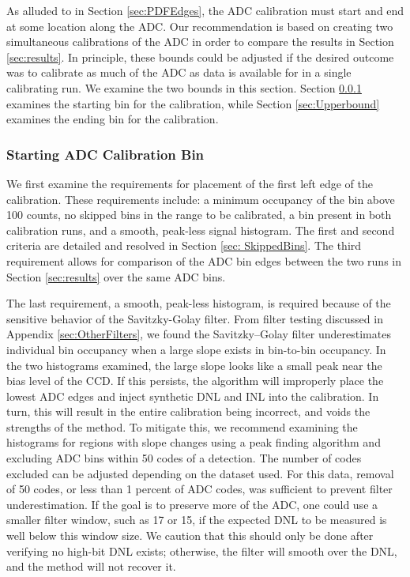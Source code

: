 \documentclass[linenumbers]{aastex7}
\begin{document}
As alluded to in Section \ref{sec:PDFEdges}, the ADC calibration must start and end at some location along the ADC. 
Our recommendation is based on creating two simultaneous calibrations of the ADC in order to compare the results in Section \ref{sec:results}. 
In principle, these bounds could be adjusted if the desired outcome was to calibrate as much of the ADC as data is available for in a single calibrating run. 
We examine the two bounds in this section. 
Section \ref{sec:Lowerbound} examines the starting bin for the calibration, while Section \ref{sec:Upperbound} examines the ending bin for the calibration.

\subsubsection{Starting ADC Calibration Bin}
\label{sec:Lowerbound}

We first examine the requirements for placement of the first left edge of the calibration. 
These requirements include: a minimum occupancy of the bin above 100 counts, no skipped bins in the range to be calibrated, a bin present in both calibration runs, and a smooth, peak-less signal histogram.  
The first and second criteria are detailed and resolved in Section \ref{sec: SkippedBins}.
The third requirement allows for comparison of the ADC bin edges between the two runs in Section \ref{sec:results} over the same ADC bins. 

The last requirement, a smooth, peak-less histogram, is required because of the sensitive behavior of the Savitzky-Golay filter.
From filter testing discussed in Appendix  \ref{sec:OtherFilters}, we found the Savitzky–Golay filter underestimates individual bin occupancy when a large slope exists in bin-to-bin occupancy.
In the two histograms examined, the large slope looks like a small peak near the bias level of the CCD. 
If this persists, the algorithm will improperly place the lowest ADC edges  and inject synthetic DNL and INL into the calibration. 
In turn, this will result in the entire calibration being incorrect, and voids the strengths of the method. 
To mitigate this, we recommend examining the histograms for regions with slope changes using a peak finding algorithm and excluding ADC bins within 50 codes of a detection.  
The number of codes excluded can be adjusted depending on the dataset used.
For this data, removal of 50 codes, or less than 1 percent of ADC codes, was sufficient to prevent filter underestimation.
If the goal is to preserve more of the ADC, one could use a smaller filter window, such as 17 or 15, if the expected DNL to be measured is well below this window size. 
We caution that this should only be done after verifying no high-bit DNL exists; otherwise, the filter will smooth over the DNL, and the method will not recover it.
\end{document}
